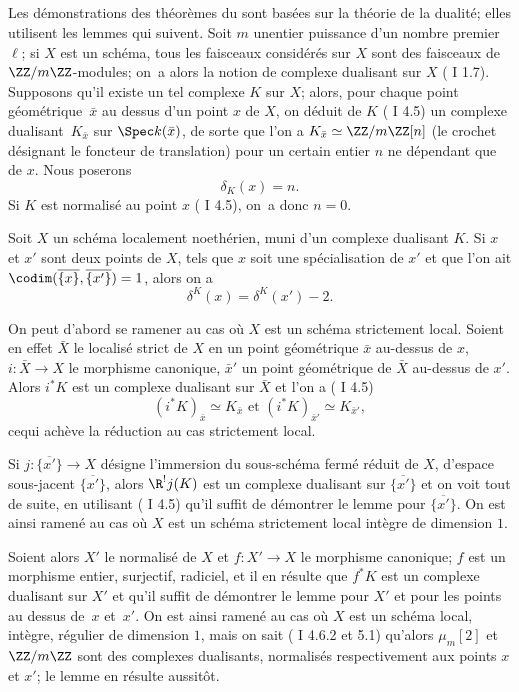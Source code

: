 \subsection{} \label{XIV.2.3}
Les d\'emonstrations des th\'eor\`emes du \numero {} sont bas\'ees sur la th\'eorie de la dualit\'e; elles utilisent les lemmes qui suivent. Soit $m$ un\pageoriginale entier puissance d'un nombre premier $\ell$; si $X$ est un sch\'ema, tous les faisceaux consid\'er\'es sur $X$ sont des faisceaux de $\ZZ/m\ZZ$-modules; on~a alors la notion de complexe dualisant sur $X$ ( I 1.7). Supposons qu'il existe un tel complexe $K$ sur $X$; alors, pour chaque point g\'eom\'etrique~$\bar x$ au dessus d'un point $x$ de $X$, on d\'eduit de $K$ (\cf {} I 4.5) un complexe dualisant~$K_{\bar x}$ sur $\Spec k(\bar x)$, de sorte que l'on a $K_{\bar x}\simeq\ZZ/m\ZZ[n]$ (le crochet d\'esignant le foncteur de translation) pour un certain entier $n$ ne d\'ependant que de $x$. Nous poserons
$$
\delta_K(x)=n.
$$
Si $K$ est normalis\'e au point $x$ ( I 4.5), on~a donc $n=0$.

\begin{sublemme} \label{XIV.2.3.1} Soit $X$ un sch\'ema localement noeth\'erien, muni d'un complexe dualisant $K$. Si $x$ et $x'$ sont deux points de $X$, tels que $x$ soit une sp\'ecialisation de $x'$ et que l'on ait $\codim(\overline{\{x\}}, \overline{\{x'\}})=1$, alors on a
$$
\delta^K(x)=\delta^{K}(x')-2.
$$
\end{sublemme}

On peut d'abord se ramener au cas o\`u $X$ est un sch\'ema strictement local. Soient en effet $\bar X$ le localis\'e strict de $X$ en un point g\'eom\'etrique $\bar x$ au-dessus de $x$, $i:\bar X\to X$ le morphisme canonique, $\bar x'$ un point g\'eom\'etrique de $\bar X$ au-dessus de $x'$. Alors $i^*K$ est un complexe dualisant sur $\bar X$ et l'on a ( I 4.5)
$$
(i^*K)_{\bar x}\simeq K_{\bar x}\text{ et } (i^*K)_{\bar x'}\simeq K_{\bar x'},
$$
ce\pageoriginale qui ach\`eve la r\'eduction au cas strictement local.

Si $j:\overline{\{x'\}}\to X$ d\'esigne l'immersion du sous-sch\'ema ferm\'e r\'eduit de $X$, d'espace sous-jacent $\overline{\{x'\}}$, alors $\R^!j(K)$ est un complexe dualisant sur $\overline{\{x'\}}$ et on voit tout de suite, en utilisant ( I 4.5) qu'il suffit de d\'emontrer le lemme pour $\overline{\{x'\}}$. On est ainsi ramen\'e au cas o\`u $X$ est un sch\'ema strictement local int\`egre de dimension $1$.

Soient alors $X'$ le normalis\'e de $X$ et $f:X'\to X$ le morphisme canonique; $f$ est un morphisme entier, surjectif, radiciel, et il en r\'esulte que $f^*K$ est un complexe dualisant sur $X'$ et qu'il suffit de d\'emontrer le lemme pour $X'$ et pour les points au dessus de~$x$ et~$x'$. On est ainsi ramen\'e au cas o\`u $X$ est un sch\'ema local, int\`egre, r\'egulier de dimension $1$, mais on sait (\cf {} I 4.6.2 et 5.1) qu'alors $\mu_m[2]$ et $\ZZ/m\ZZ$ sont des complexes dualisants, normalis\'es respectivement aux points $x$ et $x'$; le lemme en r\'esulte aussit\^{o}t.

